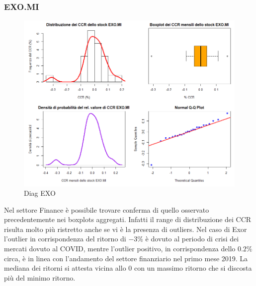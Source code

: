 \documentclass[12pt]{article}
\begin{document}
\subsubsection{EXO.MI}
\begin{figure}[!htb]
    \centering
    \includegraphics[width=1\textwidth]{immagini/diag_exo.png}
    \caption{Diag EXO}
\end{figure}
\FloatBarrier
Nel settore Finance è possibile trovare conferma di quello osservato precedentemente nei boxplots aggregati. Infatti il range di distribuzione dei CCR risulta molto più ristretto anche se vi è la presenza di outliers. Nel caso di Exor l'outlier in corrispondenza del ritorno di $-3\%$ è dovuto al periodo di crisi dei mercati dovuto al COVID, mentre l'outlier positivo, in corrispondenza dello $0.2\%$ circa, è in linea con l'andamento del settore finanziario nel primo mese 2019. La mediana dei ritorni si attesta vicina allo 0 con un massimo ritorno che si discosta più del minimo ritorno.
\newpage
\end{document}
